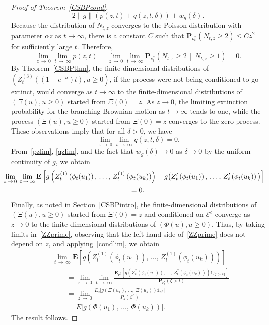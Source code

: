 \documentclass[AHL,Unicode,longabstracts,published]{cedram}
\newcommand*\E{\mathbf{E}}
\renewcommand*\P{\mathbf{P}}
\newcommand{\clE}{\mathcal{E}}
\newcommand{\1} {\mathds{1}}
\begin{document}
\begin{proof}[Proof of Theorem~\ref{CSBPcond}]
\[
2 \|g\| (p(z,t) + q(z,t,\delta)) + w_g(\delta).
\]
Because the distribution of $N_{t,z}$ converges to the Poisson distribution with parameter $\alpha z$ as $t \rightarrow \infty$, there is a constant $C$ such that $\P_{\nu_t^*}(N_{t,z} \geq 2) \leq C z^2$ for sufficiently large $t$. Therefore,
\begin{equation}\label{pzlim}
\lim_{z\,\rightarrow\,0} \lim_{t\,\rightarrow\,\infty} p(z,t) = \lim_{z\,\rightarrow\,0} \lim_{t\,\rightarrow\, \infty} \P_{\nu_t^*}\left(N_{t,z} \geq 2 \,\middle|\, N_{t,z} \geq 1\right) = 0.
\end{equation}
By Theorem~\ref{CSBPthm}, the finite-dimensional distributions of $(Z_t^{(3)}((1 - e^{-u})t), u \geq 0)$, if the process were not being conditioned to go extinct, would converge as $t \rightarrow \infty$ to the finite-dimensional distributions of $(\Xi(u), u \geq 0)$ started from $\Xi(0) = z$. As $z \rightarrow 0$, the limiting extinction probability for the branching Brownian motion as $t \rightarrow \infty$ tends to one, while the process $(\Xi(u), u \geq 0)$ started from $\Xi(0) = z$ converges to the zero process. These observations imply that for all $\delta > 0$, we have
\begin{equation}\label{qzlim}
\lim_{z\,\rightarrow\,0} \lim_{t\,\rightarrow\,\infty} q(z,t,\delta) = 0.
\end{equation}
From~\eqref{pzlim}, \eqref{qzlim}, and the fact that $w_g(\delta) \rightarrow 0$ as $\delta \rightarrow 0$ by the uniform continuity of $g$, we obtain
\begin{multline*}
\mkern-20mu\lim_{z\,\rightarrow\,0}\;\lim_{t\,\rightarrow\,\infty} \E\left[g\left(Z_t^{(1)}\left(\phi_t(u_1)\right),\, \dots,\, Z_t^{(1)}\left(\phi_t(u_k)\right)\right) - g\big(Z_t'\left(\phi_t(u_1)\right),\, \dots,\, Z_t'\left(\phi_t(u_k)\right)\big)\right]\\
 = 0.
\end{multline*}
Finally, as noted in Section~\ref{CSBPintro}, the finite-dimensional distributions of $(\Xi(u), u \geq 0)$ started from $\Xi(0) = z$ and conditioned on $\clE^c$ converge as $z \rightarrow 0$ to the finite-dimensional distributions of $(\Phi(u), u \geq 0)$. Thus, by taking limits in~\eqref{ZZprime}, observing that the left-hand side of~\eqref{ZZprime} does not depend on $z$, and applying~\eqref{condlim}, we obtain
\begin{align*}
&\lim_{t\, \rightarrow\,\infty} \E\left[g\left(Z_t^{(1)}\left(\phi_t(u_1)\right),\, \dots,\,Z_t^{(1)}\left(\phi_t(u_k)\right)\right)\right] \\
&\qquad = \lim_{z\,\rightarrow\,0} \lim_{t\,\rightarrow \,\infty} \frac{\E_{\nu_t^*}\left[g\left(Z_t^*\left(\phi_t(u_1)\right),\, \dots,\, Z_t^*\left(\phi_t(u_k)\right)\right) \1_{\{\zeta\,>\,t\}}\right]}{\P_{\nu_t^*}(\zeta > t)} \\
&\qquad = \lim_{z\,\rightarrow\,0} \frac{E_{z}\big[g\left(\Xi(u_1),\, \dots,\, \Xi(u_k)\right) \1_{\clE^c}\big]}{P_{z}\left(\clE^c\right)} \\
&\qquad = E\big[g\left(\Phi(u_1),\, \dots,\, \Phi(u_k)\right)\big].
\end{align*}
The result follows.
\end{proof}
\end{document}
